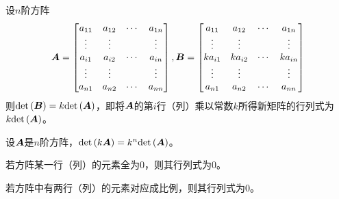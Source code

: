 \documentclass{ctexart}
\begin{document}
\begin{property}
    设\(n\)阶方阵
    \begin{equation*}
        \boldsymbol{A}=\begin{bmatrix}
            a_{11} & a_{12} & \cdots & a_{1n} \\
            \vdots & \vdots &        & \vdots \\
            a_{i1} & a_{i2} & \cdots & a_{in} \\
            \vdots & \vdots &        & \vdots \\
            a_{n1} & a_{n2} & \cdots & a_{nn}
        \end{bmatrix},\boldsymbol{B}=\begin{bmatrix}
            a_{11}  & a_{12}  & \cdots & a_{1n}  \\
            \vdots  & \vdots  &        & \vdots  \\
            ka_{i1} & ka_{i2} & \cdots & ka_{in} \\
            \vdots  & \vdots  &        & \vdots  \\
            a_{n1}  & a_{n2}  & \cdots & a_{nn}
        \end{bmatrix}
    \end{equation*}
    则\(\mathrm{det}\left( \boldsymbol{B} \right)=k\mathrm{det}\left( \boldsymbol{A} \right)\)，即将\(\boldsymbol{A}\)的第\(i\)行（列）乘以常数\(k\)所得新矩阵的行列式为\(k\mathrm{det}\left( \boldsymbol{A} \right)\)。
\end{property}

\begin{infer}
    设\(\boldsymbol{A}\)是\(n\)阶方阵，\(\mathrm{det}\left( k\boldsymbol{A} \right)=k^n\mathrm{det}\left( \boldsymbol{A} \right)\)。
\end{infer}

\begin{infer}
    若方阵某一行（列）的元素全为\(0\)，则其行列式为\(0\)。
\end{infer}

\begin{infer}
    若方阵中有两行（列）的元素对应成比例，则其行列式为\(0\)。
\end{infer}
\end{document}
